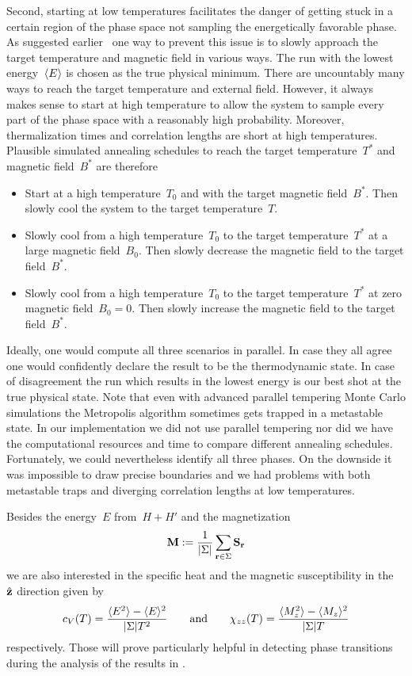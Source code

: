 Second, starting at low temperatures facilitates the danger of getting stuck in
a certain region of the phase space not sampling the energetically favorable
phase. As suggested earlier~\cite{skyrmion} one way to prevent this issue is to
slowly approach the target temperature and magnetic field in various ways. The
run with the lowest energy~$\langle E \rangle$ is chosen as the true physical minimum.
There are uncountably many ways to reach the target temperature and external
field. However, it always makes sense to start at high temperature to allow the
system to sample every part of the phase space with a reasonably high
probability. Moreover, thermalization times and correlation lengths are short at
high temperatures. Plausible simulated annealing schedules to reach the target
temperature~$T^*$ and magnetic field~$B^*$ are therefore

\begin{itemize}
  \item Start at a high temperature~$T_0$ and with the target magnetic
    field~$B^*$. Then slowly cool the system to the target temperature~$T$.
  \item Slowly cool from a high temperature~$T_0$ to the target
    temperature~$T^*$ at a large magnetic field~$B_0$. Then slowly decrease the
    magnetic field to the target field~$B^*$.
  \item Slowly cool from a high temperature~$T_0$ to the target
    temperature~$T^*$ at zero magnetic field~$B_0=0$. Then slowly increase the
    magnetic field to the target field~$B^*$.
\end{itemize}

Ideally, one would compute all three scenarios in parallel. In case they all
agree one would confidently declare the result to be the thermodynamic state. In
case of disagreement the run which results in the lowest energy is our best
shot at the true physical state. Note that even with advanced parallel tempering
Monte Carlo simulations the Metropolis algorithm sometimes gets trapped in a
metastable state. In our implementation we did not use parallel tempering nor
did we have the computational resources and time to compare different annealing
schedules. Fortunately, we could nevertheless identify all three phases. On the
downside it was impossible to draw precise boundaries and we had problems with
both metastable traps and diverging correlation lengths at low temperatures.

Besides the energy~$E$ from~$H + H'$ and the magnetization
%
\begin{equation}
  \M := \frac{1}{\abs{\Sigma}} \sum_{\r \in \Sigma} \S_{\r}
\end{equation}
%
we are also interested in the specific heat and the magnetic susceptibility in
the~$\hat{\mathbf{z}}$ direction given by
%
\begin{equation}\label{heatsusc}
  c_V (T) = \frac{\avg{E^2} - \avg{E}^2}{\abs{\Sigma} T^2} \qqtxtqq{and}
  \chi_{zz} (T) = \frac{\avg{M_z^2} - \avg{M_z}^2}{\abs{\Sigma} T}
\end{equation}
%
respectively. Those will prove particularly helpful in detecting phase
transitions during the analysis of the results in .

